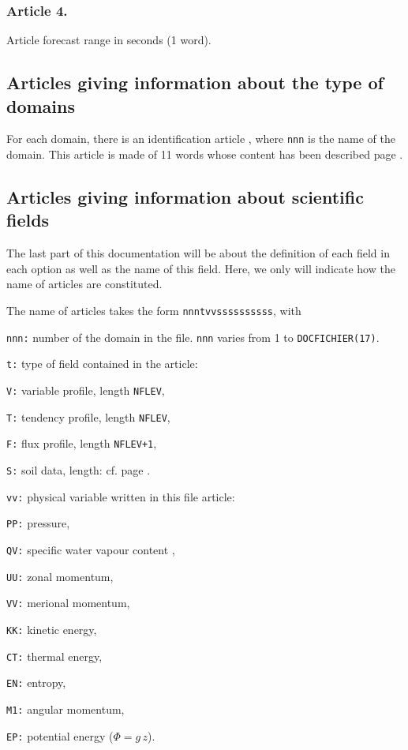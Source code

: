 \subsubsection*{Article 4.}

Article  forecast range in seconds (1 word).

\subsection{Articles giving information about the type of domains}

For each domain, there is an identification article , where
{\tt nnn} is the name of the domain. This article is made of 11 words whose
content has been described page \pageref{ARTD}.

\subsection{Articles giving information about scientific fields}
The last part of this documentation will be about the definition of each field in each option as well as the name of this field. Here, we only will indicate how the name of articles are constituted. 

The name of articles takes the form {\tt nnntvvssssssssss}, with
\begin{description}
\item{\tt nnn:} number of the domain in the file. {\tt nnn} varies from 1 to {\tt DOCFICHIER(17)}.
\item{\tt t:} type of field contained in the article:

\begin{description}
\item{\tt V:} variable profile, length {\tt NFLEV},
\item{\tt T:} tendency profile,  length {\tt NFLEV},
\item{\tt F:} flux profile, length {\tt NFLEV+1},
\item{\tt S:} soil data, length: cf. page \pageref{BSC}.
\end{description}
\item{\tt vv:} physical variable written in this file article:
\begin{description}
\item{\tt PP:} pressure,
\item{\tt QV:} specific water vapour content ,
\item{\tt UU:} zonal momentum,
\item{\tt VV:} merional momentum,
\item{\tt KK:} kinetic energy,
\item{\tt CT:} thermal energy,
\item{\tt EN:} entropy,
\item{\tt M1:} angular momentum,
\item{\tt EP:} potential energy ($\Phi = g \, z$).
\end{description}
\end{description}

